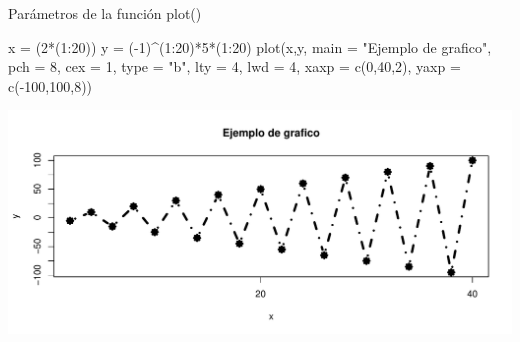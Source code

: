 \documentclass[
  ignorenonframetext,
  aspectratio=169]{beamer}
\newenvironment{Shaded}{\begin{snugshade}}{\end{snugshade}}
\newcommand{\AttributeTok}[1]{\textcolor[rgb]{0.77,0.63,0.00}{#1}}
\newcommand{\DecValTok}[1]{\textcolor[rgb]{0.00,0.00,0.81}{#1}}
\newcommand{\FunctionTok}[1]{\textcolor[rgb]{0.00,0.00,0.00}{#1}}
\newcommand{\NormalTok}[1]{#1}
\newcommand{\OtherTok}[1]{\textcolor[rgb]{0.56,0.35,0.01}{#1}}
\newcommand{\SpecialCharTok}[1]{\textcolor[rgb]{0.00,0.00,0.00}{#1}}
\newcommand{\StringTok}[1]{\textcolor[rgb]{0.31,0.60,0.02}{#1}}
\begin{document}
\begin{frame}[fragile]{Parámetros de la función plot()}
\protect\hypertarget{paruxe1metros-de-la-funciuxf3n-plot-3}{}
\begin{Shaded}
\begin{Highlighting}[]
\NormalTok{x }\OtherTok{=}\NormalTok{ (}\DecValTok{2}\SpecialCharTok{*}\NormalTok{(}\DecValTok{1}\SpecialCharTok{:}\DecValTok{20}\NormalTok{))}
\NormalTok{y }\OtherTok{=}\NormalTok{ (}\SpecialCharTok{{-}}\DecValTok{1}\NormalTok{)}\SpecialCharTok{\^{}}\NormalTok{(}\DecValTok{1}\SpecialCharTok{:}\DecValTok{20}\NormalTok{)}\SpecialCharTok{*}\DecValTok{5}\SpecialCharTok{*}\NormalTok{(}\DecValTok{1}\SpecialCharTok{:}\DecValTok{20}\NormalTok{)}
\FunctionTok{plot}\NormalTok{(x,y, }\AttributeTok{main =} \StringTok{"Ejemplo de grafico"}\NormalTok{, }\AttributeTok{pch =} \DecValTok{8}\NormalTok{, }\AttributeTok{cex =} \DecValTok{1}\NormalTok{,}
     \AttributeTok{type =} \StringTok{"b"}\NormalTok{, }\AttributeTok{lty =} \DecValTok{4}\NormalTok{, }\AttributeTok{lwd =} \DecValTok{4}\NormalTok{, }
     \AttributeTok{xaxp =} \FunctionTok{c}\NormalTok{(}\DecValTok{0}\NormalTok{,}\DecValTok{40}\NormalTok{,}\DecValTok{2}\NormalTok{), }\AttributeTok{yaxp =} \FunctionTok{c}\NormalTok{(}\SpecialCharTok{{-}}\DecValTok{100}\NormalTok{,}\DecValTok{100}\NormalTok{,}\DecValTok{8}\NormalTok{))}
\end{Highlighting}
\end{Shaded}

\begin{center}\includegraphics[width=0.8\linewidth]{Hora2_files/figure-beamer/unnamed-chunk-12-1} \end{center}
\end{frame}
\end{document}
